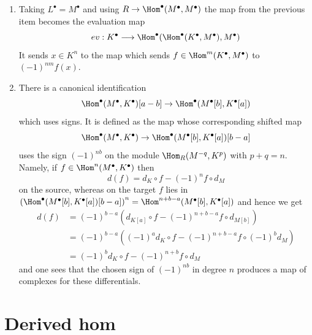 \begin{enumerate}
$$$$
which uses a sign $(-1)^{r + qr}$ on the module
$\Hom_R(L^{-q}, M^p) \otimes_R K^r$
whose reason is explained in Remark \ref{remark-sign-explanation}.
\item
\label{item-evaluation}
Taking $L^\bullet = M^\bullet$ and using
$R \to \Hom^\bullet(M^\bullet, M^\bullet)$ the map from the
previous item becomes the evaluation map
$$
ev : K^\bullet \longrightarrow
\Hom^\bullet(\Hom^\bullet(K^\bullet, M^\bullet), M^\bullet)
$$
It sends $x \in K^n$ to the map which sends
$f \in \Hom^m(K^\bullet, M^\bullet)$ to $(-1)^{nm}f(x)$.
\item
\label{item-shift-hom}
There is a canonical identification
$$
\Hom^\bullet(M^\bullet, K^\bullet)[a - b] \to
\Hom^\bullet(M^\bullet[b], K^\bullet[a])
$$
which uses signs. It is defined as the map whose corresponding shifted map
$$
\Hom^\bullet(M^\bullet, K^\bullet) \to
\Hom^\bullet(M^\bullet[b], K^\bullet[a])[b - a]
$$
uses the sign $(-1)^{nb}$ on the module $\Hom_R(M^{-q}, K^p)$
with $p + q = n$. Namely, if $f \in \Hom^n(M^\bullet, K^\bullet)$ then
$$
d(f) = d_K \circ f - (-1)^n f \circ d_M
$$
on the source, whereas on the target $f$ lies in
$\left(\Hom^\bullet(M^\bullet[b], K^\bullet[a])[b - a]\right)^n =
\Hom^{n + b -a}(M^\bullet[b], K^\bullet[a])$ and hence
we get
\begin{align*}
d(f) & =
(-1)^{b - a}
\left(d_{K[a]} \circ f - (-1)^{n + b - a} f \circ d_{M[b]}\right) \\
& =
(-1)^{b - a}
\left((-1)^a d_K \circ f - (-1)^{n + b - a} f \circ (-1)^b d_M \right) \\
& =
(-1)^b d_K \circ f - (-1)^{n + b} f \circ d_M
\end{align*}
and one sees that the chosen sign of $(-1)^{nb}$ in degree $n$
produces a map of complexes for these differentials.
\end{enumerate}








\section{Derived hom}
\label{section-RHom}

